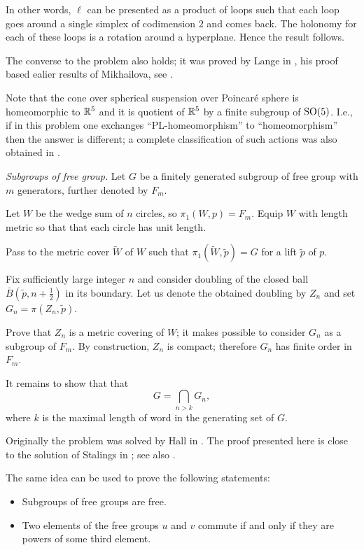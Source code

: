 In other words, $\ell$ can be presented as a product of 
loops such that each loop goes around a single simplex of codimension $2$ and comes back.
The holonomy for each of these loops is a rotation around a hyperplane.
Hence the result follows.

The converse to the problem also holds;
it was proved by Lange in \cite{lange},
his proof based ealier results of Mikhailova, see \cite{mikhailova}.

Note that the cone over spherical suspension over Poincar\'e sphere is homeomorphic to $\mathbb{R}^5$ and it is quotient of $\mathbb{R}^5$ by a finite subgroup of $\mathrm{SO}(5)$. 
I.e., if in this problem one exchanges ``PL-homeomorphism'' to ``homeomorphism'' then the answer is different; 
a complete classification of such actions was also obtained in \cite{lange}.

\textit{Subgroups of free group.}
Let $G$ be a finitely generated subgroup of free group with $m$ generators, further denoted by $F_m$.

Let $W$ be the wedge sum of $n$ circles, 
so  $\pi_1(W,p)=F_m$.
Equip $W$ with length metric so that 
that each circle has unit length.

Pass to the metric cover $\tilde W$ of $W$ 
such that  $\pi_1(\tilde W,\tilde p)=G$ 
for a lift $\tilde p$ of $p$.

Fix sufficiently large integer $n$ and consider doubling of the closed ball $\bar B(\tilde p,n+\frac12)$ in its boundary.
Let us denote the obtained doubling by $Z_n$ and set $G_n=\pi(Z_n,\tilde p)$.

Prove that $Z_n$ is a metric covering of $W$;
it makes possible to consider $G_n$ as a subgroup of $F_m$.
By construction, $Z_n$ is compact;
therefore $G_n$ has finite order in $F_m$.


It remains to show that that 
\[G=\bigcap_{n>k} G_n,\]
where $k$ is the maximal length of word in the generating set of $G$.

 
Originally the problem was solved by Hall in \cite{hall}.
The proof presented here is close to the solution of Stalings in \cite{stallings};
see also \cite{wilton}.

The same idea can be used to prove the following statements:
\begin{itemize}
\item Subgroups of free groups are free.
\item Two elements of the free groups $u$ and $v$ commute 
if and only if they are powers of
some third element.
\end{itemize}



